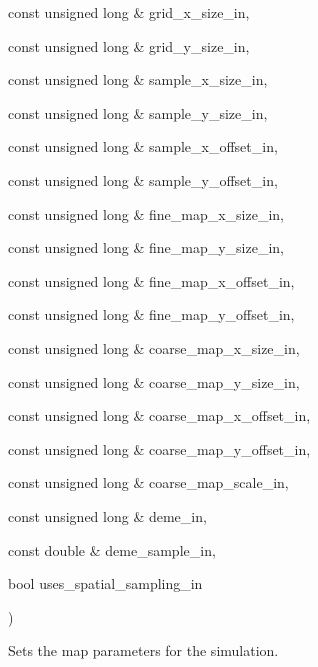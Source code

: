 {\begin{DoxyParamCaption}
\item[{const unsigned long \&}]{grid\+\_\+x\+\_\+size\+\_\+in, }
\item[{const unsigned long \&}]{grid\+\_\+y\+\_\+size\+\_\+in, }
\item[{const unsigned long \&}]{sample\+\_\+x\+\_\+size\+\_\+in, }
\item[{const unsigned long \&}]{sample\+\_\+y\+\_\+size\+\_\+in, }
\item[{const unsigned long \&}]{sample\+\_\+x\+\_\+offset\+\_\+in, }
\item[{const unsigned long \&}]{sample\+\_\+y\+\_\+offset\+\_\+in, }
\item[{const unsigned long \&}]{fine\+\_\+map\+\_\+x\+\_\+size\+\_\+in, }
\item[{const unsigned long \&}]{fine\+\_\+map\+\_\+y\+\_\+size\+\_\+in, }
\item[{const unsigned long \&}]{fine\+\_\+map\+\_\+x\+\_\+offset\+\_\+in, }
\item[{const unsigned long \&}]{fine\+\_\+map\+\_\+y\+\_\+offset\+\_\+in, }
\item[{const unsigned long \&}]{coarse\+\_\+map\+\_\+x\+\_\+size\+\_\+in, }
\item[{const unsigned long \&}]{coarse\+\_\+map\+\_\+y\+\_\+size\+\_\+in, }
\item[{const unsigned long \&}]{coarse\+\_\+map\+\_\+x\+\_\+offset\+\_\+in, }
\item[{const unsigned long \&}]{coarse\+\_\+map\+\_\+y\+\_\+offset\+\_\+in, }
\item[{const unsigned long \&}]{coarse\+\_\+map\+\_\+scale\+\_\+in, }
\item[{const unsigned long \&}]{deme\+\_\+in, }
\item[{const double \&}]{deme\+\_\+sample\+\_\+in, }
\item[{bool}]{uses\+\_\+spatial\+\_\+sampling\+\_\+in}
\end{DoxyParamCaption}
)\hspace{0.3cm}{\ttfamily [inline]}}\hypertarget{struct_sim_parameters_a4073ee2bf48a25eebdc0439e3b8625e7}{}\label{struct_sim_parameters_a4073ee2bf48a25eebdc0439e3b8625e7}


Sets the map parameters for the simulation. 


